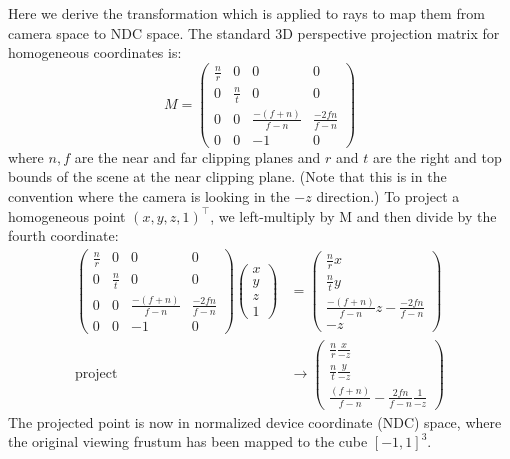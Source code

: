 \documentclass[runningheads]{llncs}
\begin{document}
Here we derive the transformation which is applied to rays to map them from camera space to NDC space. The standard 3D perspective projection matrix for homogeneous coordinates is:
\begin{equation}
    M = \begin{pmatrix}
     \frac{n}{r} & 0 & 0 & 0 \\
     0 & \frac{n}{t} & 0 & 0 \\
     0 & 0 & \frac{-(f+n)}{f-n} & \frac{-2fn}{f-n} \\
     0 & 0 & -1 & 0 
    \end{pmatrix}
\end{equation}
where $n, f$ are the near and far clipping planes and $r$ and $t$ are the right and top bounds of the scene at the near clipping plane. (Note that this is in the convention where the camera is looking in the $-z$ direction.) To project a homogeneous point $(x,y,z,1)^\top$, we left-multiply by M and then divide by the fourth coordinate:
\begin{align}
    \begin{pmatrix}
     \frac{n}{r} & 0 & 0 & 0 \\
     0 & \frac{n}{t} & 0 & 0 \\
     0 & 0 & \frac{-(f+n)}{f-n} & \frac{-2fn}{f-n} \\
     0 & 0 & -1 & 0 
    \end{pmatrix}
    \begin{pmatrix}
    x \\ y \\ z \\ 1
    \end{pmatrix}
    &=
    \begin{pmatrix}
    \frac{n}{r} x \\
    \frac{n}{t} y \\
    \frac{-(f+n)}{f-n} z - \frac{-2fn}{f-n} \\
    -z
    \end{pmatrix} \\
    \textrm{project}
    &\rightarrow
    \begin{pmatrix}
    \frac{n}{r} \frac{x}{-z} \\
    \frac{n}{t} \frac{y}{-z} \\
    \frac{(f+n)}{f-n} - \frac{2fn}{f-n} \frac{1}{-z}
    \end{pmatrix}
    \label{eq:projpt}
\end{align}
The projected point is now in normalized device coordinate (NDC) space, where the original viewing frustum has been mapped to the cube $[-1,1]^3$. 
\end{document}
